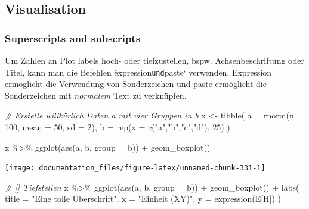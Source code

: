 \documentclass[
]{article}
\newenvironment{Shaded}{\begin{snugshade}}{\end{snugshade}}
\newcommand{\AttributeTok}[1]{\textcolor[rgb]{0.77,0.63,0.00}{#1}}
\newcommand{\CommentTok}[1]{\textcolor[rgb]{0.56,0.35,0.01}{\textit{#1}}}
\newcommand{\DecValTok}[1]{\textcolor[rgb]{0.00,0.00,0.81}{#1}}
\newcommand{\FunctionTok}[1]{\textcolor[rgb]{0.00,0.00,0.00}{#1}}
\newcommand{\NormalTok}[1]{#1}
\newcommand{\OtherTok}[1]{\textcolor[rgb]{0.56,0.35,0.01}{#1}}
\newcommand{\SpecialCharTok}[1]{\textcolor[rgb]{0.00,0.00,0.00}{#1}}
\newcommand{\StringTok}[1]{\textcolor[rgb]{0.31,0.60,0.02}{#1}}
\begin{document}
\hypertarget{visualisation}{%
\subsection{Visualisation}\label{visualisation}}

\hypertarget{superscripts-and-subscripts}{%
\subsubsection{Superscripts and subscripts}\label{superscripts-and-subscripts}}

Um Zahlen an Plot labels hoch- oder tiefzustellen, bspw. Achsenbeschriftung oder Titel, kann man die Befehlen èxpression\texttt{und}paste` verwenden. Expression ermöglicht die Verwendung von Sonderzeichen und paste ermöglicht die Sonderzeichen mit \emph{normalem} Text zu verknüpfen.

\begin{Shaded}
\begin{Highlighting}[]
\CommentTok{\# Erstelle willkürlich Daten a mit vier Gruppen in b}
\NormalTok{x }\OtherTok{\textless{}{-}} \FunctionTok{tibble}\NormalTok{(}
  \AttributeTok{a =} \FunctionTok{rnorm}\NormalTok{(}\AttributeTok{n =} \DecValTok{100}\NormalTok{, }\AttributeTok{mean =} \DecValTok{50}\NormalTok{, }\AttributeTok{sd =} \DecValTok{2}\NormalTok{),}
  \AttributeTok{b =} \FunctionTok{rep}\NormalTok{(}\AttributeTok{x =} \FunctionTok{c}\NormalTok{(}\StringTok{"a"}\NormalTok{,}\StringTok{"b"}\NormalTok{,}\StringTok{"c"}\NormalTok{,}\StringTok{"d"}\NormalTok{), }\DecValTok{25}\NormalTok{)}
\NormalTok{)}

\NormalTok{x }\SpecialCharTok{\%\textgreater{}\%}
  \FunctionTok{ggplot}\NormalTok{(}\FunctionTok{aes}\NormalTok{(a, b, }\AttributeTok{group =}\NormalTok{ b)) }\SpecialCharTok{+}
  \FunctionTok{geom\_boxplot}\NormalTok{()}
\end{Highlighting}
\end{Shaded}

\begin{center}\texttt{[image: documentation\_files/figure-latex/unnamed-chunk-331-1]} \end{center}

\begin{Shaded}
\begin{Highlighting}[]

\CommentTok{\# [] Tiefstellen}
\NormalTok{x }\SpecialCharTok{\%\textgreater{}\%}
  \FunctionTok{ggplot}\NormalTok{(}\FunctionTok{aes}\NormalTok{(a, b, }\AttributeTok{group =}\NormalTok{ b)) }\SpecialCharTok{+}
  \FunctionTok{geom\_boxplot}\NormalTok{() }\SpecialCharTok{+}
  \FunctionTok{labs}\NormalTok{(}
    \AttributeTok{title =} \StringTok{"Eine tolle Überschrift"}\NormalTok{,}
    \AttributeTok{x =} \StringTok{"Einheit (XY)"}\NormalTok{,}
    \AttributeTok{y =} \FunctionTok{expression}\NormalTok{(E[H])}
\NormalTok{  )}
\end{Highlighting}
\end{Shaded}
\end{document}

